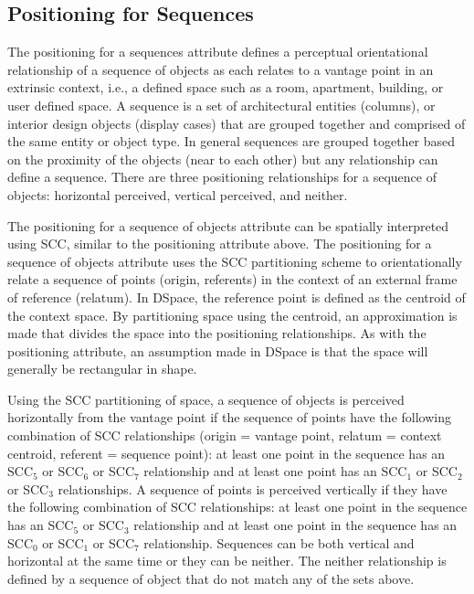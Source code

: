 \documentclass[12pt]{ucthesis}
\begin{document}
\subsection{Positioning for Sequences}
The positioning for a sequences attribute defines a perceptual orientational relationship of a sequence of objects as each relates to a vantage point in an extrinsic context, i.e., a defined space such as a room, apartment, building, or user defined space. A sequence is a set of architectural entities (columns), or interior design objects (display cases) that are grouped together and comprised of the same entity or object type. In general sequences are grouped together based on the proximity of the objects (near to each other) but any relationship can define a sequence. There are three positioning relationships for a sequence of objects: horizontal perceived, vertical perceived, and neither.  

The positioning for a sequence of objects attribute can be spatially interpreted using SCC, similar to the positioning attribute above. The positioning for a sequence of objects attribute uses the SCC partitioning scheme to orientationally relate a sequence of points (origin, referents) in the context of an external frame of reference (relatum). In DSpace, the reference point is defined as the centroid of the context space. By partitioning space using the centroid, an approximation is made that divides the space into the positioning relationships. As with the positioning attribute, an assumption made in DSpace is that the space will generally be rectangular in shape.

Using the SCC partitioning of space, a sequence of objects is perceived horizontally from the vantage point if the sequence of points have the following combination of SCC relationships (origin = vantage point, relatum = context centroid, referent = sequence point): at least one point in the sequence has an SCC$_{5}$ or SCC$_{6}$ or SCC$_{7}$ relationship and at least one point has an SCC$_{1}$ or SCC$_{2}$ or SCC$_{3}$ relationships. A sequence of points is perceived vertically if they have the following combination of SCC relationships: at least one point in the sequence has an SCC$_{5}$ or SCC$_{3}$ relationship and at least one point in the sequence has an SCC$_{0}$ or SCC$_{1}$ or SCC$_{7}$ relationship. Sequences can be both vertical and horizontal at the same time or they can be neither. The neither relationship is defined by a sequence of object that do not match any of the sets above.
\end{document}
